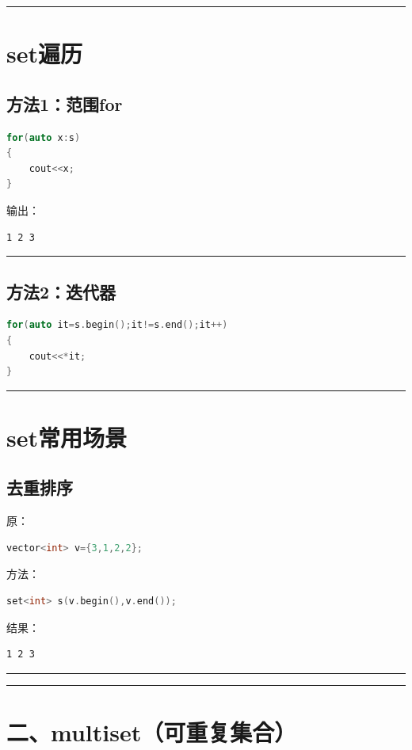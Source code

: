 \documentclass[10pt,twocolumn]{extarticle}
\begin{document}
\noindent\rule{\linewidth}{0.4pt}

\section{set遍历}

\subsection{方法1：范围for}
\begin{lstlisting}[language=C++]
for(auto x:s)
{
    cout<<x;
}
\end{lstlisting}
输出：
\begin{lstlisting}
1 2 3
\end{lstlisting}

\noindent\rule{\linewidth}{0.4pt}

\subsection{方法2：迭代器}
\begin{lstlisting}[language=C++]
for(auto it=s.begin();it!=s.end();it++)
{
    cout<<*it;
}
\end{lstlisting}

\noindent\rule{\linewidth}{0.4pt}

\section{set常用场景}

\subsection{去重排序}
原：
\begin{lstlisting}[language=C++]
vector<int> v={3,1,2,2};
\end{lstlisting}
方法：
\begin{lstlisting}[language=C++]
set<int> s(v.begin(),v.end());
\end{lstlisting}
结果：
\begin{lstlisting}
1 2 3
\end{lstlisting}

\noindent\rule{\linewidth}{0.4pt}
\noindent\rule{\linewidth}{0.4pt}

\section{二、multiset（可重复集合）}
\end{document}
